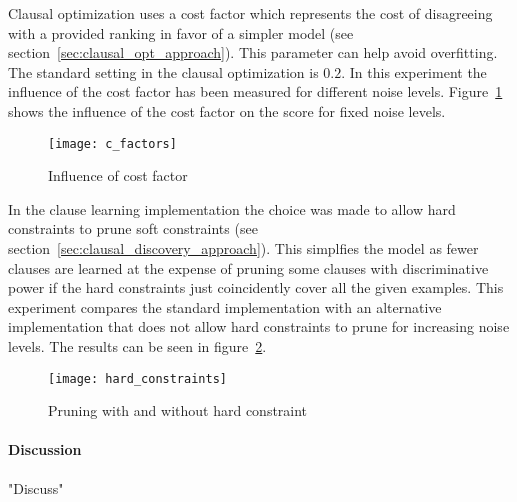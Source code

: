 \begin{experiment}
	
	Clausal optimization uses a cost factor which represents the cost of disagreeing with a provided ranking in favor of a simpler model (see section~\ref{sec:clausal_opt_approach}).
	This parameter can help avoid overfitting.
	The standard setting in the clausal optimization is $0.2$.
	In this experiment the influence of the cost factor has been measured for different noise levels.
	Figure~\ref{fig:c_factors} shows the influence of the cost factor on the score for fixed noise levels.

	\begin{figure}

		\caption{Influence of cost factor}
		\centering
			\texttt{[image: c\_factors]}
		\label{fig:c_factors}

	\end{figure}

\end{experiment}


\begin{experiment}
	
	In the clause learning implementation the choice was made to allow hard constraints to prune soft constraints (see section~\ref{sec:clausal_discovery_approach}).
	This simplfies the model as fewer clauses are learned at the expense of pruning some clauses with discriminative power if the hard constraints just coincidently cover all the given examples.
	This experiment compares the standard implementation with an alternative implementation that does not allow hard constraints to prune for increasing noise levels.
	The results can be seen in figure~\ref{fig:hard_constraints}.

	\begin{figure}

		\caption{Pruning with and without hard constraint}
		\centering
			\texttt{[image: hard\_constraints]}
		\label{fig:hard_constraints}

	\end{figure}

\end{experiment}

\paragraph{Discussion}
"Discuss"